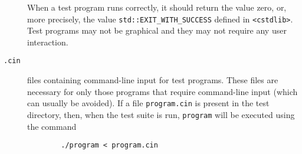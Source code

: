 \begin{description}
        When a test program runs correctly, it should return
         the
        value zero, or, more precisely, the value \verb|std::EXIT_WITH_SUCCESS|
        defined in \verb|<cstdlib>|.
        Test programs may not be graphical and they may not require any user 
        interaction.   
   \item[{\tt *.cin}] files containing command-line input for 
        test programs.  These files are necessary for only those programs 
        that require command-line input (which can usually be avoided).  
        If a file \texttt{program.cin} is 
        present in the test directory, then, when the test suite is run,
        \texttt{program} will be executed using the command
        \begin{verbatim}
        ./program < program.cin
        \end{verbatim}
\end{description} 

